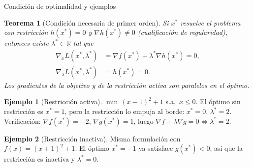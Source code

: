 \documentclass[10pt,aspectratio=169]{beamer}
\theoremstyle{definition}
\newtheorem{ejemplo}{Ejemplo}
\theoremstyle{plain}
\newtheorem{teorema}{Teorema}
\begin{document}
\begin{frame}[t]{Condición de optimalidad y ejemplos}
  \begin{teorema}[Condición necesaria de primer orden]
    Si $x^{*}$ resuelve el problema con restricción $h(x^{*})=0$ y
    $\nabla h(x^{*})\neq 0$ (cualificación de regularidad), entonces existe
    $\lambda^{*}\in\mathbb{R}$ tal que
    \begin{align*}
      \nabla_{x} L(x^{*},\lambda^{*}) &= \nabla f(x^{*}) + \lambda^{*}\nabla h(x^{*}) = 0,\\
      \nabla_{\lambda} L(x^{*},\lambda^{*}) &= h(x^{*}) = 0.
    \end{align*}
    \emph{Los gradientes de la objetivo y de la restricción activa son
    paralelos en el óptimo.}
  \end{teorema}

  \vspace{0.2em}
  \begin{ejemplo}[Restricción activa]
    $\min\,(x-1)^{2}+1$ s.a.\ $x\leq 0$.
    El óptimo sin restricción es $x^{*}=1$, pero la restricción lo empuja
    al borde: $x^{*}=0$, $\lambda^{*}=2$.
    Verificación: $\nabla f(x^{*})=-2$, $\nabla g(x^{*})=1$, luego
    $\nabla f+\lambda\nabla g=0 \Leftrightarrow \lambda^{*}=2$.
  \end{ejemplo}

  \vspace{0.2em}
  \begin{ejemplo}[Restricción inactiva]
    Misma formulación con $f(x)=(x+1)^{2}+1$. El óptimo $x^{*}=-1$ ya
    satisface $g(x^{*})<0$, así que la restricción es inactiva y
    $\lambda^{*}=0$.
  \end{ejemplo}
\end{frame}
\end{document}
